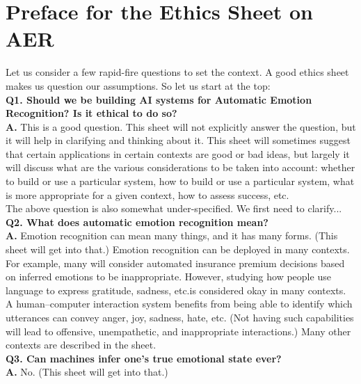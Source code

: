 \documentclass{clv3}
\begin{document}
\section{Preface for the Ethics Sheet on AER}
Let us consider a few rapid-fire questions to set the context. A good ethics sheet makes us question our assumptions. So let us start at the top:\\[7pt]
\noindent \textbf{Q1. Should we be building AI systems for Automatic Emotion Recognition? Is it ethical to do so?}\\[2pt]
\noindent \textbf{A.} This is a good question. %
This sheet will not explicitly answer the question, but it will help in clarifying and thinking about it. This sheet will sometimes suggest that certain applications in certain contexts are good or bad ideas, but largely it will discuss what are the various considerations to be taken into account: whether to build or use a particular system, 
how to build or use a particular system,
what is more appropriate for a given context, how to assess success, etc.\\[2pt]
The above question is also somewhat under-specified. We first need to clarify...\\[7pt]
\noindent \textbf{Q2. What does automatic emotion recognition mean?}\\[3pt]
\noindent \textbf{A.} Emotion recognition can mean many things, and it has many forms. (This sheet will get into that.) Emotion recognition can be deployed in many contexts. For example, many will consider automated insurance premium decisions based on inferred emotions to be inappropriate. However, studying how people use language to express gratitude, sadness, etc.\@ is considered okay in many contexts. A human--computer interaction system benefits from being able to identify which utterances can convey anger, joy, sadness, hate, etc. (Not having such capabilities will lead to offensive, unempathetic, and inappropriate interactions.) Many other contexts are described in the sheet.\\[8pt]
\noindent \textbf{Q3. Can machines infer one’s true emotional state ever?}\\[2pt]
\noindent \textbf{A.} No. (This sheet will get into that.)\\[7pt]
\end{document}
